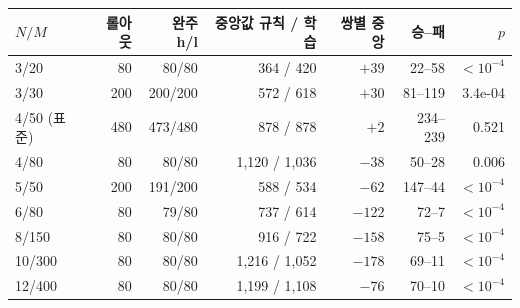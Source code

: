 \begin{tabular}{lrrrrrr}
\toprule
$N/M$ & 롤아웃 & 완주 h/l & 중앙값 규칙 / 학습 & 쌍별 중앙 & 승--패 & $p$ \\
\midrule
3/20 & 80 & 80/80 & 364 / 420 & $+39$ & 22--58 & $<10^{-4}$ \\
3/30 & 200 & 200/200 & 572 / 618 & $+30$ & 81--119 & 3.4e-04 \\
4/50 (표준) & 480 & 473/480 & 878 / 878 & $+2$ & 234--239 & 0.521 \\
4/80 & 80 & 80/80 & 1,120 / 1,036 & $-38$ & 50--28 & 0.006 \\
5/50 & 200 & 191/200 & 588 / 534 & $-62$ & 147--44 & $<10^{-4}$ \\
6/80 & 80 & 79/80 & 737 / 614 & $-122$ & 72--7 & $<10^{-4}$ \\
8/150 & 80 & 80/80 & 916 / 722 & $-158$ & 75--5 & $<10^{-4}$ \\
10/300 & 80 & 80/80 & 1,216 / 1,052 & $-178$ & 69--11 & $<10^{-4}$ \\
12/400 & 80 & 80/80 & 1,199 / 1,108 & $-76$ & 70--10 & $<10^{-4}$ \\
\bottomrule
\end{tabular}%
